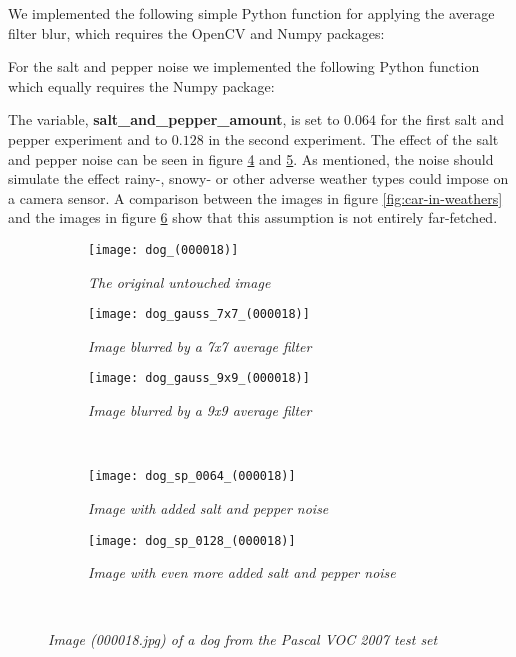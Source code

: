 \documentclass{article}
\begin{document}
We implemented the following simple Python function for applying the average filter blur, which requires the OpenCV and Numpy packages: 


  
For the salt and pepper noise we implemented the following Python function which equally requires the Numpy package:



The variable, \textbf{salt\_and\_pepper\_amount}, is set to $0.064$ for the first salt and pepper experiment and to $0.128$ in the second experiment. The effect of the salt and pepper noise can be seen in figure \ref{fig:dog4} and \ref{fig:dog5}. As mentioned, the noise should simulate the effect rainy-, snowy- or other adverse weather types could impose on a camera sensor. A comparison between the images in figure \ref{fig:car-in-weathers} and the images in figure \ref{fig:dogs} show that this assumption is not entirely far-fetched. 

\begin{figure}
\begin{subfigure}{\linewidth}
\centering
\texttt{[image: dog\_(000018)]}
\caption{\textit{The original untouched image}}
\label{fig:dog1}
\end{subfigure}
\begin{subfigure}{.5\linewidth}
\centering
\texttt{[image: dog\_gauss\_7x7\_(000018)]}
\caption{\textit{Image blurred by a 7x7 average filter}}
\label{fig:dog2}
\end{subfigure}%
\begin{subfigure}{.5\linewidth}
\centering
\texttt{[image: dog\_gauss\_9x9\_(000018)]}
\caption{\textit{Image blurred by a 9x9 average filter}}
\label{fig:dog3}
\end{subfigure}\\[1ex]
\begin{subfigure}{.5\linewidth}
\centering
\texttt{[image: dog\_sp\_0064\_(000018)]}
\caption{\textit{Image with added salt and pepper noise}}
\label{fig:dog4}
\end{subfigure}%
\begin{subfigure}{.5\linewidth}
\centering
\texttt{[image: dog\_sp\_0128\_(000018)]}
\caption{\textit{Image with even more added salt and pepper noise}}
\label{fig:dog5}
\end{subfigure}\\[1ex]
\caption{\textit{Image (000018.jpg) of a dog from the Pascal VOC 2007 test set}}
\label{fig:dogs}
\end{figure}
\end{document}
